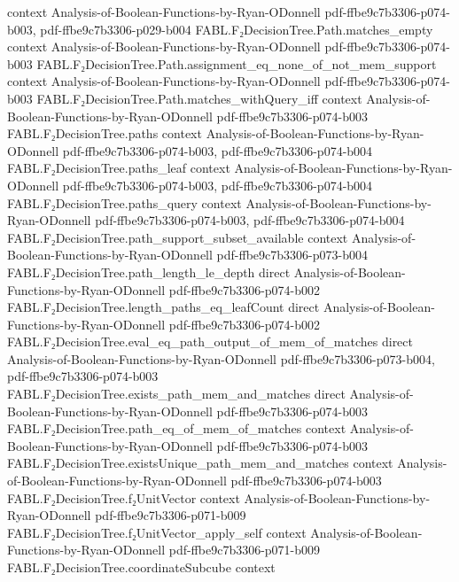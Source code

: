 \begin{theorem}
  {context}
  {Analysis-of-Boolean-Functions-by-Ryan-ODonnell}
  {pdf-ffbe9c7b3306-p074-b003,
    pdf-ffbe9c7b3306-p029-b004}
\proofstep
  {FABL.F₂DecisionTree.Path.matches_empty}
  {context}
  {Analysis-of-Boolean-Functions-by-Ryan-ODonnell}
  {pdf-ffbe9c7b3306-p074-b003}
\proofstep
  {FABL.F₂DecisionTree.Path.assignment_eq_none_of_not_mem_support}
  {context}
  {Analysis-of-Boolean-Functions-by-Ryan-ODonnell}
  {pdf-ffbe9c7b3306-p074-b003}
\proofstep
  {FABL.F₂DecisionTree.Path.matches_withQuery_iff}
  {context}
  {Analysis-of-Boolean-Functions-by-Ryan-ODonnell}
  {pdf-ffbe9c7b3306-p074-b003}
\proofstep
  {FABL.F₂DecisionTree.paths}
  {context}
  {Analysis-of-Boolean-Functions-by-Ryan-ODonnell}
  {pdf-ffbe9c7b3306-p074-b003,
    pdf-ffbe9c7b3306-p074-b004}
\proofstep
  {FABL.F₂DecisionTree.paths_leaf}
  {context}
  {Analysis-of-Boolean-Functions-by-Ryan-ODonnell}
  {pdf-ffbe9c7b3306-p074-b003,
    pdf-ffbe9c7b3306-p074-b004}
\proofstep
  {FABL.F₂DecisionTree.paths_query}
  {context}
  {Analysis-of-Boolean-Functions-by-Ryan-ODonnell}
  {pdf-ffbe9c7b3306-p074-b003,
    pdf-ffbe9c7b3306-p074-b004}
\proofstep
  {FABL.F₂DecisionTree.path_support_subset_available}
  {context}
  {Analysis-of-Boolean-Functions-by-Ryan-ODonnell}
  {pdf-ffbe9c7b3306-p073-b004}
\proofstep
  {FABL.F₂DecisionTree.path_length_le_depth}
  {direct}
  {Analysis-of-Boolean-Functions-by-Ryan-ODonnell}
  {pdf-ffbe9c7b3306-p074-b002}
\proofstep
  {FABL.F₂DecisionTree.length_paths_eq_leafCount}
  {direct}
  {Analysis-of-Boolean-Functions-by-Ryan-ODonnell}
  {pdf-ffbe9c7b3306-p074-b002}
\proofstep
  {FABL.F₂DecisionTree.eval_eq_path_output_of_mem_of_matches}
  {direct}
  {Analysis-of-Boolean-Functions-by-Ryan-ODonnell}
  {pdf-ffbe9c7b3306-p073-b004,
    pdf-ffbe9c7b3306-p074-b003}
\proofstep
  {FABL.F₂DecisionTree.exists_path_mem_and_matches}
  {direct}
  {Analysis-of-Boolean-Functions-by-Ryan-ODonnell}
  {pdf-ffbe9c7b3306-p074-b003}
\proofstep
  {FABL.F₂DecisionTree.path_eq_of_mem_of_matches}
  {context}
  {Analysis-of-Boolean-Functions-by-Ryan-ODonnell}
  {pdf-ffbe9c7b3306-p074-b003}
\proofstep
  {FABL.F₂DecisionTree.existsUnique_path_mem_and_matches}
  {context}
  {Analysis-of-Boolean-Functions-by-Ryan-ODonnell}
  {pdf-ffbe9c7b3306-p074-b003}
\proofstep
  {FABL.F₂DecisionTree.f₂UnitVector}
  {context}
  {Analysis-of-Boolean-Functions-by-Ryan-ODonnell}
  {pdf-ffbe9c7b3306-p071-b009}
\proofstep
  {FABL.F₂DecisionTree.f₂UnitVector_apply_self}
  {context}
  {Analysis-of-Boolean-Functions-by-Ryan-ODonnell}
  {pdf-ffbe9c7b3306-p071-b009}
\proofstep
  {FABL.F₂DecisionTree.coordinateSubcube}
  {context}

\end{theorem}
